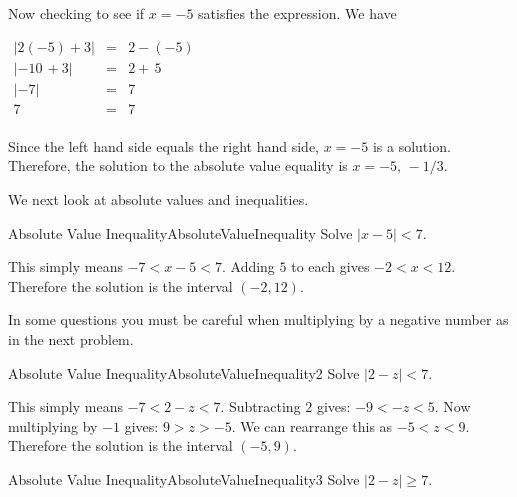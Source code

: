 \begin{solution}
Now checking to see if $x=-5$ satisfies the expression. We have

\hspace{4cm} $\begin{array}{rcl}
\displaystyle{\left| 2 (-5) +3 \right|} & = & \displaystyle{2-\left( -5 \right)} \\
\displaystyle{\left| -10 \, +3\right|} & = & \displaystyle{2+ \, 5 } \\
	\displaystyle{ \left| -7 \right|} & = & \displaystyle{ 7 } \\
	\displaystyle{ 7 } & = &  \displaystyle{ 7 } \\
\end{array} $	

Since the left hand side equals the right hand side,  $x=-5$ is a solution.\\
Therefore, the solution to the absolute value equality is $x=-5, \, -1/3$. 
\end{solution}

We next look at absolute values and inequalities. \\

\begin{example}{Absolute Value Inequality}{AbsoluteValueInequality}
Solve $|x-5|<7$.
\end{example}

\begin{solution} 
This simply means $-7<x-5<7$.
Adding $5$ to each gives $-2<x<12$.
Therefore the solution is the interval $(-2,12)$.
\end{solution}

In some questions you must be careful when multiplying by a negative number as in the next problem. \\

\begin{example}{Absolute Value Inequality}{AbsoluteValueInequality2}
Solve $|2-z|<7$.
\end{example}

\begin{solution} 
This simply means $-7<2-z<7$.
Subtracting $2$ gives: $-9<-z<5$.
Now multiplying by $-1$ gives: $9>z>-5$. 
We can rearrange this as $-5<z<9$.
Therefore the solution is the interval $(-5,9)$.
\end{solution}

\bigskip

\begin{example}{Absolute Value Inequality}{AbsoluteValueInequality3}
Solve $|2-z|\geq 7$.
\end{example}

